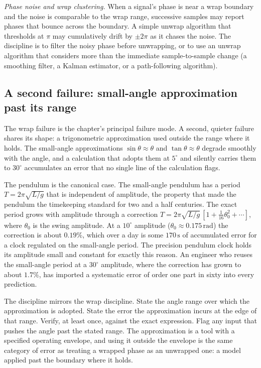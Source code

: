 

\textit{Phase noise and wrap clustering.} When a signal's phase
is near a wrap boundary and the noise is comparable to the
wrap range, successive samples may report phases that bounce
across the boundary. A simple unwrap algorithm that thresholds at
$\pi$ may cumulatively drift by $\pm 2\pi$ as it
chases the noise. The discipline is to filter the noisy phase
before unwrapping, or to use an unwrap algorithm that considers
more than the immediate sample-to-sample change (a smoothing
filter, a Kalman estimator, or a path-following algorithm).

\subsection{A second failure: small-angle approximation past its range}

The wrap failure is the chapter's principal failure mode. A second,
quieter failure shares its shape: a trigonometric approximation used
outside the range where it holds. The small-angle approximations
$\sin\theta \approx \theta$ and $\tan\theta \approx \theta$
degrade smoothly with the angle, and a calculation that adopts them
at $5^{\circ}$ and silently carries them to $30^{\circ}$ accumulates
an error that no single line of the calculation flags.

The pendulum is the canonical case. The small-angle pendulum has a
period $T = 2\pi\sqrt{L/g}$ that is independent of amplitude, the
property that made the pendulum the timekeeping standard for two and
a half centuries. The exact period grows with amplitude through a
correction $T = 2\pi\sqrt{L/g}\,[1 + \tfrac{1}{16}\theta_{0}^{2} +
\cdots]$, where $\theta_{0}$ is the swing amplitude. At a $10^{\circ}$
amplitude ($\theta_{0} \approx 0.175\,\text{rad}$) the correction is
about $0.19\%$, which over a day is some $170\,\si{\second}$ of
accumulated error for a clock regulated on the small-angle period.
The precision pendulum clock holds its amplitude small and constant
for exactly this reason. An engineer who reuses the small-angle
period at a $30^{\circ}$ amplitude, where the correction has grown to
about $1.7\%$, has imported a systematic error of order one part in
sixty into every prediction.

The discipline mirrors the wrap discipline. State the angle range
over which the approximation is adopted. State the error the
approximation incurs at the edge of that range. Verify, at least
once, against the exact expression. Flag any input that pushes the
angle past the stated range. The approximation is a tool with a
specified operating envelope, and using it outside the envelope is
the same category of error as treating a wrapped phase as an
unwrapped one: a model applied past the boundary where it holds.

